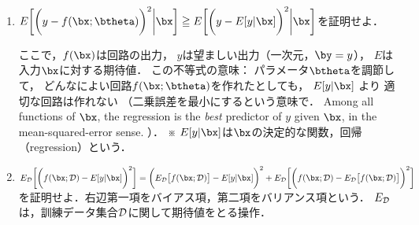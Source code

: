 \documentclass[a4paper,11pt]{jarticle}
\begin{document}
\begin{enumerate}
       \newpage
       


 \item 
      $ E \biggl [ \biggl ( y-f(\bx; \btheta) \biggr )^2 \bigg | \bx \biggr ] \geqq
E \biggl [ \biggl ( y-E[y | \bx] \biggr )^2 \bigg | \bx \biggr ] 
       $を証明せよ．
\vspace*{2mm}
       
       ここで，$f(\bx)$は回路の出力，
       $y$は望ましい出力（一次元，$\by=y$），
       $E$は入力$\bx$に対する期待値．
       この不等式の意味：
       パラメータ$\btheta$を調節して，
       どんなによい回路$f(\bx;\btheta)$を作れたとしても，
       $E[y | \bx]$ より
       適切な回路は作れない
       （二乗誤差を最小にするという意味で．
       Among all functions of $\bx$,
       the regression is the {\it best} predictor of $y$
given $\bx$, in the mean-squared-error sense.
       ）．
       ※ $E[y|\bx]$は$\bx$の決定的な関数，回帰（regression）という．


\newpage



 \item 
       $ E_{\cal D} \biggl [ \biggl ( f(\bx;{\cal D}) - E[y|\bx] \biggr )^2  \biggr ]
       =
       \biggl ( E_{\cal D} \bigl [ f(\bx;{\cal D}) \bigr ] - E[y|\bx] \biggr )^2
       + E_{\cal D} \biggl [ \biggl ( f(\bx;{\cal D}) - E_{\cal D} \bigl
       [f(\bx;{\cal
       D}) \bigr ] \biggr )^2\biggr ]
$
       を証明せよ．右辺第一項をバイアス項，第二項をバリアンス項という．
$E_{\cal D}$は，訓練データ集合${\cal D}$に関して期待値をとる操作．
       \vspace*{2mm}

\end{enumerate}
\end{document}

